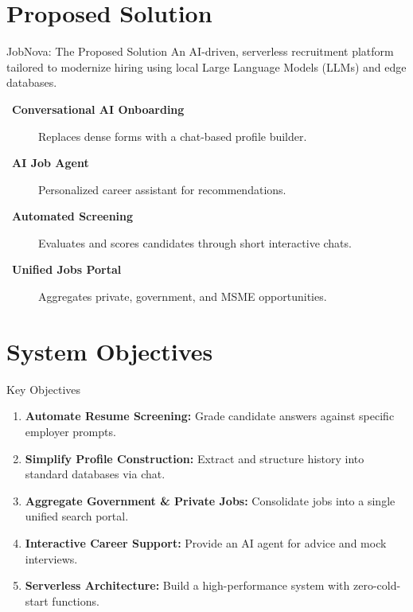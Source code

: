 \documentclass[aspectratio=169]{beamer}
\begin{document}
\section{Proposed Solution}

\begin{frame}{JobNova: The Proposed Solution}
    An AI-driven, serverless recruitment platform tailored to modernize hiring using local Large Language Models (LLMs) and edge databases.
    
    \vspace{0.3cm}
    \begin{description}
        \item[\faRobot\ \textbf{Conversational AI Onboarding}] Replaces dense forms with a chat-based profile builder.
        \item[\faComments\ \textbf{AI Job Agent}] Personalized career assistant for recommendations.
        \item[\faClipboardCheck\ \textbf{Automated Screening}] Evaluates and scores candidates through short interactive chats.
        \item[\faLandmark\ \textbf{Unified Jobs Portal}] Aggregates private, government, and MSME opportunities.
    \end{description}
\end{frame}

\section{System Objectives}

\begin{frame}{Key Objectives}
    \begin{enumerate}
        \item \textbf{Automate Resume Screening:} Grade candidate answers against specific employer prompts.
        \item \textbf{Simplify Profile Construction:} Extract and structure history into standard databases via chat.
        \item \textbf{Aggregate Government \& Private Jobs:} Consolidate jobs into a single unified search portal.
        \item \textbf{Interactive Career Support:} Provide an AI agent for advice and mock interviews.
        \item \textbf{Serverless Architecture:} Build a high-performance system with zero-cold-start functions.
    \end{enumerate}
\end{frame}
\end{document}
